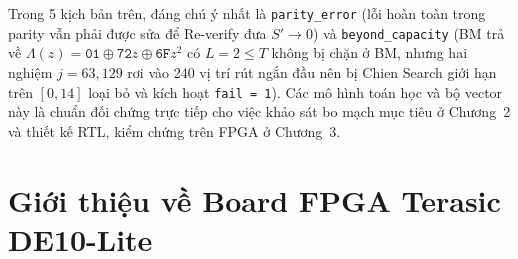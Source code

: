 \documentclass[11pt,a4paper]{report}
\begin{document}
\begin{table}[!htb]
\centering
\caption{Các đại lượng giải mã trung gian của Golden Model cho 5 bộ test vector.}
\label{tab:vectors_trace_summary}
\scriptsize
\setlength{\tabcolsep}{3.5pt}
\end{table}

Trong 5 kịch bản trên, đáng chú ý nhất là \texttt{parity\_error} (lỗi hoàn toàn trong parity vẫn phải được sửa để Re-verify đưa $S' \to 0$) và \texttt{beyond\_capacity} (BM trả về $\Lambda(z) = \texttt{01} \oplus \texttt{72}z \oplus \texttt{6F}z^2$ có $L = 2 \le T$ không bị chặn ở BM, nhưng hai nghiệm $j = 63, 129$ rơi vào 240 vị trí rút ngắn đầu nên bị Chien Search giới hạn trên $[0, 14]$ loại bỏ và kích hoạt \texttt{fail = 1}). Các mô hình toán học và bộ vector này là chuẩn đối chứng trực tiếp cho việc khảo sát bo mạch mục tiêu ở Chương~2 và thiết kế RTL, kiểm chứng trên FPGA ở Chương~3.

\chapter{Giới thiệu về Board FPGA Terasic DE10-Lite}
\label{ch:de10-lite}
\end{document}
